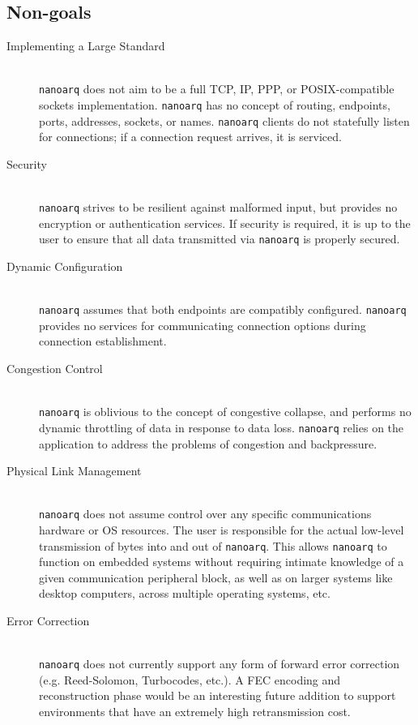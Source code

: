 \documentclass[11pt]{article}
\newcommand{\nanoarq}{\texttt{nanoarq}}
\begin{document}
\subsection{Non-goals}
\begin{description}
\item[Implementing a Large Standard] \hfill \\
    \nanoarq{} does not aim to be a full TCP, IP, PPP, or POSIX-compatible sockets implementation. \nanoarq{} has no concept of routing, endpoints, ports, addresses, sockets, or names. \nanoarq{} clients do not statefully listen for connections; if a connection request arrives, it is serviced.

\item[Security] \hfill \\
    \nanoarq{} strives to be resilient against malformed input, but provides no encryption or authentication services. If security is required, it is up to the user to ensure that all data transmitted via \nanoarq{} is properly secured.

\item[Dynamic Configuration] \hfill \\
    \nanoarq{} assumes that both endpoints are compatibly configured. \nanoarq{} provides no services for communicating connection options during connection establishment.

\item[Congestion Control] \hfill \\
    \nanoarq{} is oblivious to the concept of congestive collapse, and performs no dynamic throttling of data in response to data loss. \nanoarq{} relies on the application to address the problems of congestion and backpressure.

\item[Physical Link Management] \hfill \\
    \nanoarq{} does not assume control over any specific communications hardware or OS resources. The user is responsible for the actual low-level transmission of bytes into and out of \nanoarq{}. This allows \nanoarq{} to function on embedded systems without requiring intimate knowledge of a given communication peripheral block, as well as on larger systems like desktop computers, across multiple operating systems, etc.

\item[Error Correction] \hfill \\
    \nanoarq{} does not currently support any form of forward error correction (e.g. Reed-Solomon, Turbocodes, etc.). A FEC encoding and reconstruction phase would be an interesting future addition to support environments that have an extremely high retransmission cost.
\end{description}
\end{document}
